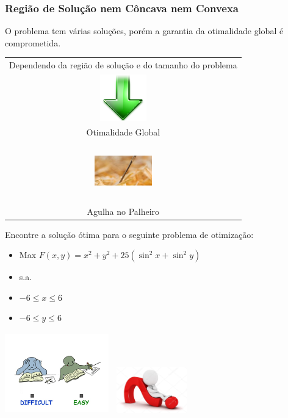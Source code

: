 \documentclass{beamer}
\begin{document}
\begin{frame}
	\frametitle{Região de Solução nem Côncava nem Convexa}
	\centering
	{
	O problema tem várias soluções, porém a garantia da otimalidade global é comprometida.
	\begin{table}
		\begin{tabular}{c}
			Dependendo da região de solução e do tamanho do problema \\
			\includegraphics[width=2cm,height=2cm]{seta_baixo.png} \\
			Otimalidade Global \\
			\includegraphics[width=2.5cm,height=2.5cm]{agulha_palheiro.jpg} \\
			Agulha no Palheiro \\
		\end{tabular}
	\end{table}
	}
	{
	\begin{alertblock}{Encontre a solução ótima para o seguinte problema de otimização:}
		\begin{itemize}
		\item[] Max $F(x,y) = x^2 + y^2 + 25( \sin^2 x + \sin^2 y)$
		\item[] s.a.
		\item[] $ -6 \le x \le 6$
		\item[] $ -6 \le y \le 6$
		\end{itemize}
	\end{alertblock}
	\includegraphics[width=4.5cm,height=3.5cm]{easyhard.jpg}
	\includegraphics[width=3.5cm,height=2cm]{interrogacao.jpg}
	}
	
\end{frame}
\end{document}
